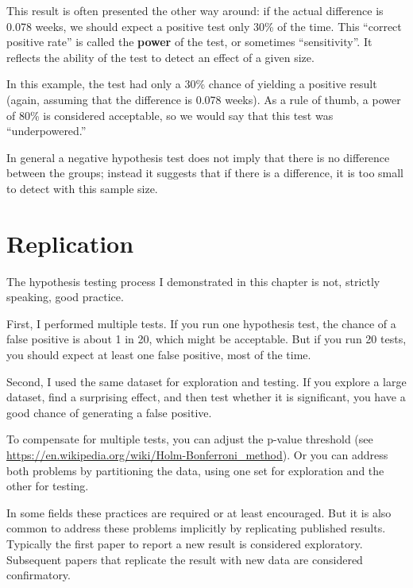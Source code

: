 \documentclass[12pt]{book}
\begin{document}
This result is often presented the other way around: if the actual
difference is 0.078 weeks, we should expect a positive test only 30\%
of the time.  This ``correct positive rate'' is called the {\bf power}
of the test, or sometimes ``sensitivity''.  It reflects the ability of
the test to detect an effect of a given size.

In this example, the test had only a 30\% chance of yielding a
positive result (again, assuming that the difference is 0.078 weeks).
As a rule of thumb, a power of 80\% is considered acceptable, so
we would say that this test was ``underpowered.''

In general a negative hypothesis test does not imply that there is no
difference between the groups; instead it suggests that if there is a
difference, it is too small to detect with this sample size.


\section{Replication}
\label{replication}

The hypothesis testing process I demonstrated in this chapter is not,
strictly speaking, good practice.

First, I performed multiple tests.  If you run one hypothesis test,
the chance of a false positive is about 1 in 20, which might be
acceptable.  But if you run 20 tests, you should expect at least one
false positive, most of the time.

Second, I used the same dataset for exploration and testing.  If
you explore a large dataset, find a surprising effect, and then test
whether it is significant, you have a good chance of generating a
false positive.
 

To compensate for multiple tests, you can adjust the p-value
threshold (see
  \url{https://en.wikipedia.org/wiki/Holm-Bonferroni_method}).  Or you
can address both problems by partitioning the data, using one set for
exploration and the other for testing.

In some fields these practices are required or at least encouraged.
But it is also common to address these problems implicitly by
replicating published results.  Typically the first paper to report a
new result is considered exploratory.  Subsequent papers that
replicate the result with new data are considered confirmatory.
\end{document}
